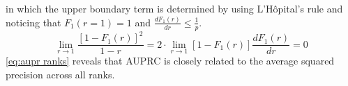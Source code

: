 %
in which the upper boundary term is determined by using L'Hôpital's rule and noticing that $F_1(r=1) = 1$ and
$\frac{d F_1(r)}{dr} \le \frac{1}{p}$.
%
\begin{equation*}
    \lim_{r \to 1} \frac{[1 - F_1(r)]^2}{1 - r}
    = 2 \cdot \lim_{r \to 1} \left[1 - F_1(r)\right] \frac{d F_1(r)}{dr}
    = 0
\end{equation*}
%
\autoref{eq:aupr ranks} reveals that AUPRC is closely related to the average squared precision across all ranks.



%  

